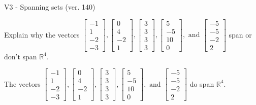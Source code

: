 \begin{exercise}
  \begin{exerciseTitle}V3 - Spanning sets (ver. 140)\end{exerciseTitle}
  \begin{exerciseStatement}
    Explain why the vectors \(\left[\begin{array}{r}
-1 \\
1 \\
-2 \\
-3
\end{array}\right] , \left[\begin{array}{r}
0 \\
4 \\
-2 \\
1
\end{array}\right] , \left[\begin{array}{r}
3 \\
3 \\
3 \\
3
\end{array}\right] , \left[\begin{array}{r}
5 \\
-5 \\
10 \\
0
\end{array}\right] , \text{ and } \left[\begin{array}{r}
-5 \\
-5 \\
-2 \\
2
\end{array}\right]\) span or don't span \(\mathbb{R}^4\). 
	


  \end{exerciseStatement}
  \begin{exerciseAnswer}
   The vectors \(\left[\begin{array}{r}
-1 \\
1 \\
-2 \\
-3
\end{array}\right] , \left[\begin{array}{r}
0 \\
4 \\
-2 \\
1
\end{array}\right] , \left[\begin{array}{r}
3 \\
3 \\
3 \\
3
\end{array}\right] , \left[\begin{array}{r}
5 \\
-5 \\
10 \\
0
\end{array}\right] , \text{ and } \left[\begin{array}{r}
-5 \\
-5 \\
-2 \\
2
\end{array}\right]\) 
  	 do  
	span \(\mathbb{R}^4\).
  



\end{exerciseAnswer}
\end{exercise}
